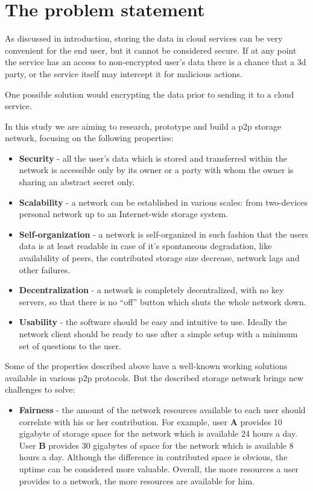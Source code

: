 \section{The problem statement}

As discussed in introduction, storing the data in cloud services
can be very convenient for the end user, but it cannot be considered
secure. If at any point the service has an access to non-encrypted
user's data there is a chance that a 3d party, or the service itself
may intercept it for malicious actions.

One possible solution would encrypting the data prior to sending it
to a cloud service.

In this study we are aiming to research, prototype and build a p2p storage
network, focusing on the following properties:

\begin{itemize}
\item \textbf{Security} - all the user's data which is stored and transferred
  within the network is accessible only by its owner or a party with whom the
  owner is sharing an abstract secret only.
\item \textbf{Scalability} - a network can be established in various
  scales: from two-devices personal network up to an Internet-wide storage
  system.
\item \textbf{Self-organization} - a network is self-organized in such
  fashion that the users data is at least readable in case of it's spontaneous
  degradation, like availability of peers, the contributed storage size
  decrease, network lags and other failures.
\item \textbf{Decentralization} - a network is completely decentralized,
  with no key servers, so that there is no ``off'' button which shuts the
  whole network down.
\item \textbf{Usability} - the software should be easy and intuitive to
  use. Ideally the network client should be ready to use after a  simple
  setup with a minimum set of questions to the user.
\end{itemize}

Some of the properties described above have a well-known working solutions
available in various p2p protocols. But the described storage network brings
new challenges to solve:

\begin{itemize}
\item \textbf{Fairness} - the amount of the network resources available
  to each user should correlate with his or her contribution. For example,
  user \textbf{A} provides 10 gigabyte of storage space for the network which
  is available 24 hours a day. User \textbf{B} provides 30 gigabytes of space
  for the network which is available 8 hours a day. Although the difference in
  contributed space is obvious, the uptime can be considered more valuable.
  Overall, the more resources a user provides to a network, the more resources
  are available for him. 

  
\end{itemize}

